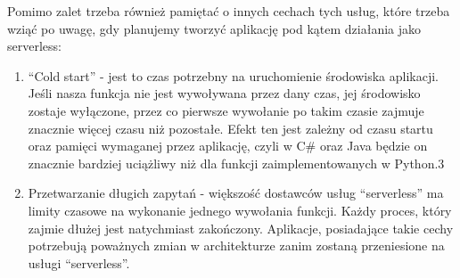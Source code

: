Pomimo zalet trzeba również pamiętać o innych cechach tych usług, które trzeba wziąć po uwagę, gdy planujemy tworzyć aplikację pod kątem działania jako serverless:

\begin{enumerate}
    \item “Cold start” - jest to czas potrzebny na uruchomienie środowiska aplikacji. Jeśli nasza funkcja nie jest wywoływana przez dany czas, jej środowisko zostaje wyłączone, przez co pierwsze wywołanie po takim czasie zajmuje znacznie więcej czasu niż pozostałe. Efekt ten jest zależny od czasu startu oraz pamięci wymaganej przez aplikację, czyli w C# oraz Java będzie on znacznie bardziej uciążliwy niż dla funkcji zaimplementowanych w Python.3

    \item Przetwarzanie długich zapytań - większość dostawców usług “serverless” ma limity czasowe na wykonanie jednego wywołania funkcji. Każdy proces, który zajmie dłużej jest natychmiast zakończony. Aplikacje, posiadające takie cechy potrzebują poważnych zmian w architekturze zanim zostaną przeniesione na usługi “serverless”.
\end{enumerate}

